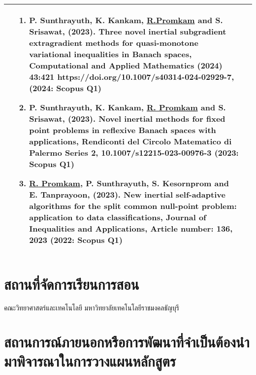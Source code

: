 {\begin{center}
\begin{longtable}{|p{}|p{}|p{}|}
& 
\begin{enumerate}[series=dear]
	\item P. Sunthrayuth, K. Kankam,  \underline{R.Promkam} and S. Srisawat, (2023). Three novel inertial subgradient extragradient methods for quasi-monotone variational inequalities in Banach spaces, Computational and Applied Mathematics (2024) 43:421 https://doi.org/10.1007/s40314-024-02929-7, (2024: Scopus Q1)
	\item P. Sunthrayuth, K. Kankam, \underline{R. Promkam} and S. Srisawat, (2023). Novel inertial methods for fixed point problems in reflexive Banach spaces with applications, Rendiconti del Circolo Matematico di Palermo Series 2, 10.1007/s12215-023-00976-3 (2023: Scopus Q1)
	\item \underline{R. Promkam}, P. Sunthrayuth, S. Kesornprom and E. Tanprayoon, (2023). New inertial self-adaptive algorithms for the split common null-point problem: application to data classifications, Journal of Inequalities and Applications, Article number: 136, 2023 (2022: Scopus Q1)
\end{enumerate}
 \\ \hline

\end{longtable}
\end{center}

\section{สถานที่จัดการเรียนการสอน}
	คณะวิทยาศาสตร์และเทคโนโลยี มหาวิทยาลัยเทคโนโลยีราชมงคลธัญบุรี
\section{สถานการณ์ภายนอกหรือการพัฒนาที่จำเป็นต้องนำมาพิจารณาในการวางแผนหลักสูตร} \label{event_plan}
}
